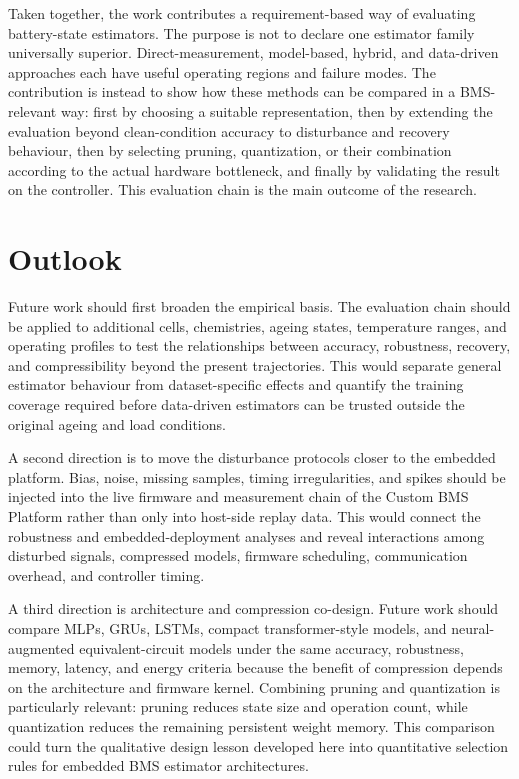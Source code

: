 \documentclass[
    a4paper,
    12pt,
    titlepage,
    bibliography=totoc,
    twoside=on,
    parskip=false,
    numbers=noenddot,
    cleardoublepage=empty,
    DIV=12,
    BCOR=12.0mm,
    headheight=36pt,
    headings=openright
]{scrreprt}
\begin{document}
Taken together, the work contributes a requirement-based way of evaluating battery-state estimators. The purpose is not to declare one estimator family universally superior. Direct-measurement, model-based, hybrid, and data-driven approaches each have useful operating regions and failure modes. The contribution is instead to show how these methods can be compared in a BMS-relevant way: first by choosing a suitable representation, then by extending the evaluation beyond clean-condition accuracy to disturbance and recovery behaviour, then by selecting pruning, quantization, or their combination according to the actual hardware bottleneck, and finally by validating the result on the controller. This evaluation chain is the main outcome of the research.

\section{Outlook}
Future work should first broaden the empirical basis. The evaluation chain should be applied to additional cells, chemistries, ageing states, temperature ranges, and operating profiles to test the relationships between accuracy, robustness, recovery, and compressibility beyond the present trajectories. This would separate general estimator behaviour from dataset-specific effects and quantify the training coverage required before data-driven estimators can be trusted outside the original ageing and load conditions.

A second direction is to move the disturbance protocols closer to the embedded platform. Bias, noise, missing samples, timing irregularities, and spikes should be injected into the live firmware and measurement chain of the Custom BMS Platform rather than only into host-side replay data. This would connect the robustness and embedded-deployment analyses and reveal interactions among disturbed signals, compressed models, firmware scheduling, communication overhead, and controller timing.

A third direction is architecture and compression co-design. Future work should compare MLPs, GRUs, LSTMs, compact transformer-style models, and neural-augmented equivalent-circuit models under the same accuracy, robustness, memory, latency, and energy criteria because the benefit of compression depends on the architecture and firmware kernel. Combining pruning and quantization is particularly relevant: pruning reduces state size and operation count, while quantization reduces the remaining persistent weight memory. This comparison could turn the qualitative design lesson developed here into quantitative selection rules for embedded BMS estimator architectures.
\end{document}
